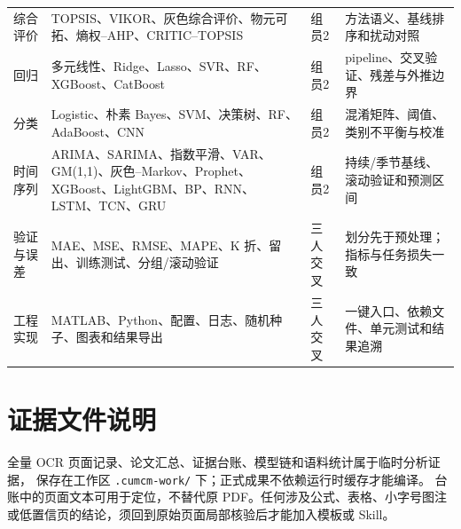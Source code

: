 \documentclass[UTF8,a4paper,12pt]{ctexart}
\begin{document}
\begin{longtable}{p{2.1cm}p{5.0cm}p{2.0cm}p{5.5cm}}
综合评价 & TOPSIS、VIKOR、灰色综合评价、物元可拓、熵权--AHP、CRITIC--TOPSIS & 组员2 & 方法语义、基线排序和扰动对照\\
回归 & 多元线性、Ridge、Lasso、SVR、RF、XGBoost、CatBoost & 组员2 & pipeline、交叉验证、残差与外推边界\\
分类 & Logistic、朴素 Bayes、SVM、决策树、RF、AdaBoost、CNN & 组员2 & 混淆矩阵、阈值、类别不平衡与校准\\
时间序列 & ARIMA、SARIMA、指数平滑、VAR、GM(1,1)、灰色--Markov、Prophet、XGBoost、LightGBM、BP、RNN、LSTM、TCN、GRU & 组员2 & 持续/季节基线、滚动验证和预测区间\\
验证与误差 & MAE、MSE、RMSE、MAPE、K 折、留出、训练测试、分组/滚动验证 & 三人交叉 & 划分先于预处理；指标与任务损失一致\\
工程实现 & MATLAB、Python、配置、日志、随机种子、图表和结果导出 & 三人交叉 & 一键入口、依赖文件、单元测试和结果追溯\\
\bottomrule
\end{longtable}

\section{证据文件说明}

全量 OCR 页面记录、论文汇总、证据台账、模型链和语料统计属于临时分析证据，
保存在工作区 \texttt{.cumcm-work/} 下；正式成果不依赖运行时缓存才能编译。
台账中的页面文本可用于定位，不替代原 PDF。任何涉及公式、表格、小字号图注
或低置信页的结论，须回到原始页面局部核验后才能加入模板或 Skill。
\end{document}
